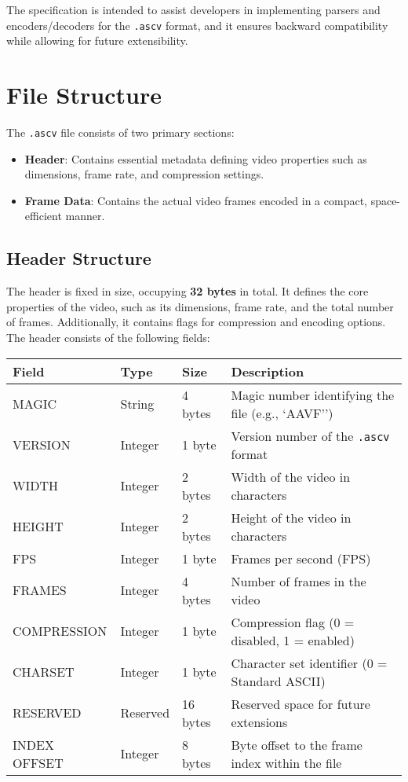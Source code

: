 \documentclass{article}
\begin{document}
The specification is intended to assist developers in implementing parsers and encoders/decoders for the \texttt{.ascv} format, and it ensures backward compatibility while allowing for future extensibility.

\section{File Structure}

The \texttt{.ascv} file consists of two primary sections:

\begin{itemize}
    \item \textbf{Header}: Contains essential metadata defining video properties such as dimensions, frame rate, and compression settings.
    \item \textbf{Frame Data}: Contains the actual video frames encoded in a compact, space-efficient manner.
\end{itemize}

\subsection{Header Structure}

The header is fixed in size, occupying \textbf{32 bytes} in total. It defines the core properties of the video, such as its dimensions, frame rate, and the total number of frames. Additionally, it contains flags for compression and encoding options. The header consists of the following fields:

\begin{longtable}{|l|l|l|l|}
\hline
\textbf{Field} & \textbf{Type} & \textbf{Size} & \textbf{Description} \\
\hline
\endfirsthead
\hline
MAGIC & String & 4 bytes & Magic number identifying the file (e.g., `AAVF'') \\
VERSION & Integer & 1 byte & Version number of the \texttt{.ascv} format \\
WIDTH & Integer & 2 bytes & Width of the video in characters \\
HEIGHT & Integer & 2 bytes & Height of the video in characters \\
FPS & Integer & 1 byte & Frames per second (FPS) \\
FRAMES & Integer & 4 bytes & Number of frames in the video \\
COMPRESSION & Integer & 1 byte & Compression flag (0 = disabled, 1 = enabled) \\
CHARSET & Integer & 1 byte & Character set identifier (0 = Standard ASCII) \\
RESERVED & Reserved & 16 bytes & Reserved space for future extensions \\
INDEX OFFSET & Integer & 8 bytes & Byte offset to the frame index within the file \\
\hline
\end{longtable}
\end{document}

